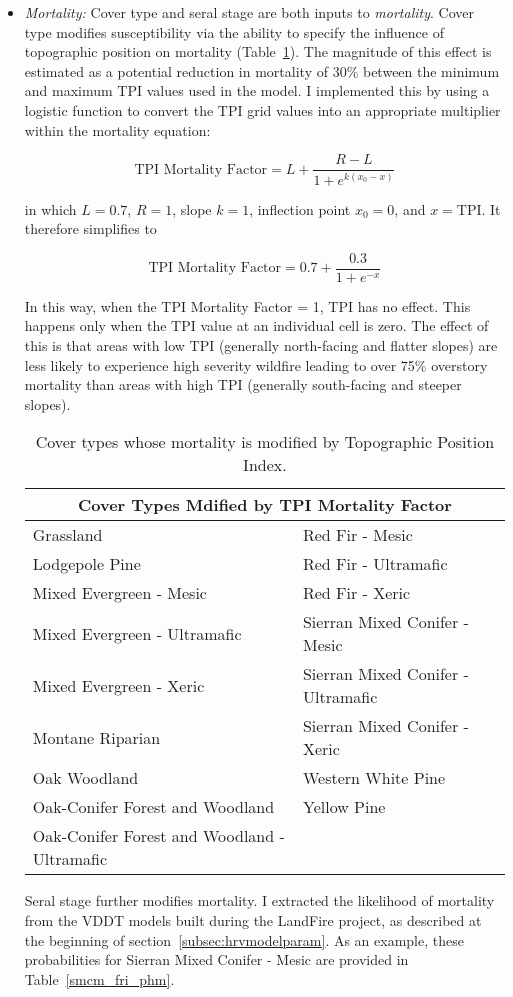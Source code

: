 \begin{itemize}
\item \emph{Mortality:} Cover type and seral stage are both inputs to \emph{mortality}. Cover type modifies susceptibility via the ability to specify the influence of topographic position on mortality (Table~\ref{covtpi_mort}). The magnitude of this effect is estimated as a potential reduction in mortality of 30\% between the minimum and maximum TPI values used in the model. I implemented this by using a logistic function to convert the TPI grid values into an appropriate multiplier within the mortality equation:


$$\text{TPI Mortality Factor} = L + \frac{R-L}{1+e^{k(x_0-x)}}$$

in which $L= 0.7$, $R=1$, slope $k=1$, inflection point $x_0=0$, and $x=\text{TPI}$. %
It therefore simplifies to 

$$\text{TPI Mortality Factor} = 0.7 + \frac{0.3}{1+e^{-x}}$$

In this way, when the TPI Mortality Factor = 1, TPI has no effect. This happens only when the TPI value at an individual cell is zero. The effect of this is that areas with low TPI (generally north-facing and flatter slopes) are less likely to experience high severity wildfire leading to over 75\% overstory mortality than areas with high TPI (generally south-facing and steeper slopes).

\begin{table}[htbp]
\footnotesize
\centering
\caption{Cover types whose mortality is modified by Topographic Position Index.}
\label{covtpi_mort}
\begin{tabular}{ll}
\hline
\multicolumn{2}{c}{\textbf{Cover Types Mdified by TPI Mortality Factor}} \\
\hline
Grassland     					& Red Fir - Mesic   			\\
Lodgepole Pine    				& Red Fir - Ultramafic			\\
Mixed Evergreen - Mesic				& Red Fir - Xeric    			\\
Mixed Evergreen - Ultramafic     		& Sierran Mixed Conifer - Mesic    	\\
Mixed Evergreen - Xeric 			& Sierran Mixed Conifer - Ultramafic 	\\
Montane Riparian				& Sierran Mixed Conifer - Xeric 	\\
Oak Woodland 					& Western White Pine			\\
Oak-Conifer Forest and Woodland 		& Yellow Pine 				\\
Oak-Conifer Forest and Woodland - Ultramafic 	&					\\
\hline
\end{tabular}
\end{table}

Seral stage further modifies mortality. I extracted the likelihood of mortality from the VDDT models built during the LandFire project, as described at the beginning of section~\ref{subsec:hrvmodelparam}. As an example, these probabilities for Sierran Mixed Conifer - Mesic are provided in Table~\ref{smcm_fri_phm}.



\end{itemize}

